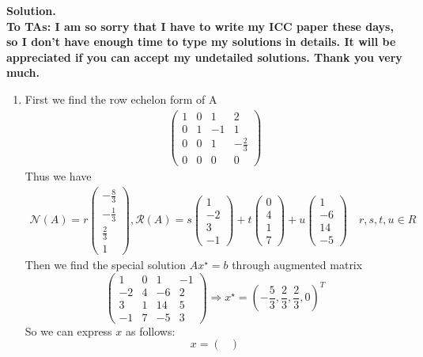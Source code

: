 \documentclass[english,onecolumn]{IEEEtran}
\begin{document}
\noindent\textbf{Solution.}\\
\textbf{To TAs: I am so sorry that I have to write my ICC paper these days, so I don't have enough time to type my solutions in details. It will be appreciated if you can accept my undetailed solutions. Thank you very much.}
\begin{enumerate}
    \item First we find the row echelon form of A
    \begin{align*}
\begin{pmatrix}
1 & 0 & 1 & 2 \\ 
0 & 1 & -1 & 1 \\ 
0 & 0 & 1 & -\frac{2}{3} \\ 
0 & 0 & 0 & 0
\end{pmatrix} 
    \end{align*}
    Thus we have
    \begin{align*}
	\mathcal{N}(A)=r
	\begin{pmatrix}
	-\frac{8}{3} \\ -\frac{1}{3} \\ \frac{2}{3} \\1
	\end{pmatrix}, 
	\mathcal{R}(A)= s
	\begin{pmatrix}
	1 \\ -2 \\ 3 \\ -1
	\end{pmatrix}
	 + 	t\begin{pmatrix}
	 0 \\4 \\ 1 \\ 7
	 \end{pmatrix} + u	\begin{pmatrix}
	 1 \\ -6 \\ 14 \\ -5
	 \end{pmatrix}\quad r,s,t,u\in R
	\end{align*}
	Then we find the special solution $Ax^\star=b$ through augmented matrix
	$$\begin{pmatrix}
		1 & 0 & 1 & -1 \\ 
		-2 & 4 & -6 & 2 \\ 
		3 & 1 & 14 & 5 \\ 
		-1 & 7 & -5 & 3
	\end{pmatrix} \Rightarrow x^\star = (-\frac{5}{3},\frac{2}{3},\frac{2}{3},0)^T$$
	So we can express $x$ as follows:
	$$x=\begin{pmatrix}

\end{pmatrix}$$
\end{enumerate}
\end{document}
